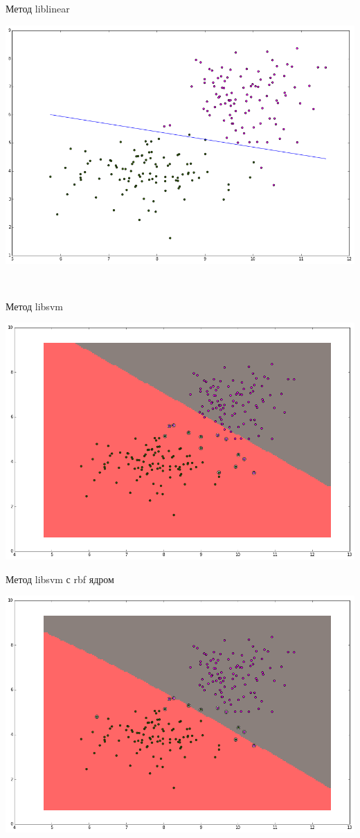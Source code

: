 \documentclass[12pt, a4paper]{article}
\begin{document}
			Метод liblinear
			\begin{center}
				\includegraphics[width=16cm]{7par_liblin.png}
			\end{center}

			~\newline
			~\newline

			Метод libsvm
			\begin{center}
				\includegraphics[width=16cm]{7par_libsvm.png}
			\end{center}

			Метод libsvm с rbf ядром
			\begin{center}
				\includegraphics[width=16cm]{7par_libsvm_rbf.png}
			\end{center}
\end{document}
